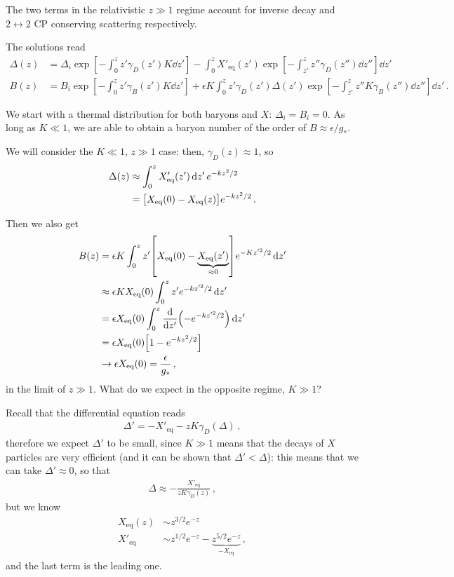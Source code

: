 \documentclass[main.tex]{subfiles}
\begin{document}
The two terms in the relativistic \(z \gg 1\) regime account for inverse decay and \(2 \leftrightarrow 2\) CP conserving scattering respectively.

The solutions read 
%
\begin{align}
\Delta (z) &= \Delta _i \exp[ - \int_0^{z} z' \gamma _D (z') K \dd{z'}]
- \int_0^{z} X'_{\text{eq}} (z') \exp[- \int_{z'}^{z} z'' \gamma _D(z'') \dd{z''}] \dd{z'}  \\
B(z) &= B_i \exp[- \int_0^{z} z' \gamma _B (z') K \dd{z'}]
+ \epsilon K \int_0^{z} z' \gamma _D (z') \Delta (z') \exp[- \int_{z'}^{z} z'' K \gamma _B (z'') \dd{z''}] \dd{z'}
\,.
\end{align}

We start with a thermal distribution for both baryons and \(X\): \(\Delta _i = B_i = 0\). 
As long as \(K \ll 1\), we are able to obtain a baryon number of the order of \(B \approx \epsilon / g_*\). 

We will consider the \(K \ll 1\), \(z \gg 1\) case: then, \(\gamma _D (z) \approx 1\), so 
%
\begin{align}
\Delta (z) &\approx \int_0^{z} X'_{\text{eq}} (z') \dd{z'} e^{- k z^2 / 2}  \\
&= \qty[X _{\text{eq}} (0) - X _{\text{eq}} (z)] e^{- k z^2 / 2}
\,.
\end{align}

Then we also get
%
\begin{align}
B(z) &= \epsilon K \int_0^{z} z' \qty[X _{\text{eq}} (0) - \underbrace{X _{\text{eq}} (z')}_{\approx 0}] e^{- K z^{\prime 2} / 2} \dd{z'}  \\
&\approx \epsilon K X _{\text{eq}} (0) \int_0^{z} z' e^{- k z^{\prime 2} / 2} \dd{z'}  \\
&= \epsilon X _{\text{eq}}(0) \int_0^{z} \dv{}{z'} \qty(- e^{- k z^{\prime 2} / 2}) \dd{z'}  \\
&= \epsilon X _{\text{eq}} (0) \qty[1 - e^{-k z^2 /2}]  \\
&\to \epsilon X _{\text{eq}} (0) = \frac{\epsilon}{g_*}
\,,
\end{align}
%
in the limit of \(z \gg 1\). 
What do we expect in the opposite regime, \(K \gg 1\)? 

Recall that the differential equation reads 
%
\begin{align}
\Delta ' = - X' _{\text{eq}} - z K \gamma _D (\Delta )
\,,
\end{align}
%
therefore we expect \(\Delta '\) to be small, since \(K \gg 1\) means that the decays of \(X\) particles are very efficient (and it can be shown that \(\Delta ' < \Delta \)): this means that we can take \(\Delta ' \approx 0\), so that 
%
\begin{align}
\Delta \approx - \frac{X' _{\text{eq}}}{z K \gamma _D(z)}
\,,
\end{align}
%
but we know 
%
\begin{align}
X _{\text{eq}} (z ) &\sim z^{3/2} e^{-z}  \\
X' _{\text{eq}} &\sim z^{1/2} e^{-z} - \underbrace{z^{5/2} e^{-z}}_{- X _{\text{eq}}}
\,,
\end{align}
%
and the last term is the leading one.
\end{document}

